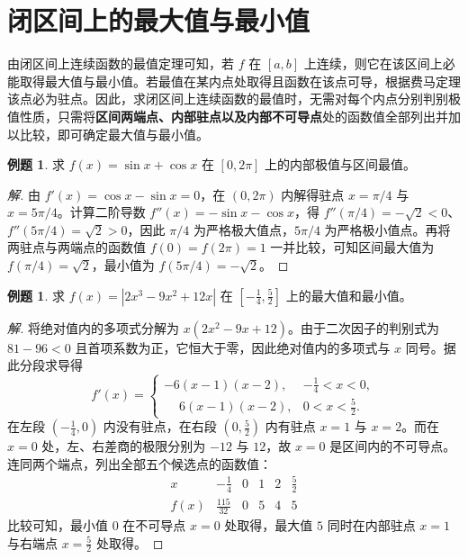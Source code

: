 \documentclass[UTF8,fontset=fandol,a4paper,12pt]{ctexart}
\theoremstyle{definition}
\newtheorem{example}[theorem]{例题}
\begin{document}
\section{闭区间上的最大值与最小值}
由闭区间上连续函数的最值定理可知，若 $f$ 在 $[a,b]$ 上连续，则它在该区间上必能取得最大值与最小值。若最值在某内点处取得且函数在该点可导，根据费马定理该点必为驻点。因此，求闭区间上连续函数的最值时，无需对每个内点分别判别极值性质，只需将\textbf{区间两端点、内部驻点以及内部不可导点}处的函数值全部列出并加以比较，即可确定最大值与最小值。

\begin{example}
求 $f(x)=\sin x+\cos x$ 在 $[0,2\pi]$ 上的内部极值与区间最值。
\end{example}

\begin{proof}[解]
由 $f'(x)=\cos x-\sin x=0$，在 $(0,2\pi)$ 内解得驻点 $x=\pi/4$ 与 $x=5\pi/4$。计算二阶导数 $f''(x)=-\sin x-\cos x$，得 $f''(\pi/4)=-\sqrt2<0$、$f''(5\pi/4)=\sqrt2>0$，因此 $\pi/4$ 为严格极大值点，$5\pi/4$ 为严格极小值点。再将两驻点与两端点的函数值 $f(0)=f(2\pi)=1$ 一并比较，可知区间最大值为 $f(\pi/4)=\sqrt2$，最小值为 $f(5\pi/4)=-\sqrt2$。
\end{proof}

\begin{example}
求 $f(x)=|2x^3-9x^2+12x|$ 在 $\left[-\frac14,\frac52\right]$ 上的最大值和最小值。
\end{example}

\begin{proof}[解]
将绝对值内的多项式分解为 $x(2x^2-9x+12)$。由于二次因子的判别式为 $81-96<0$ 且首项系数为正，它恒大于零，因此绝对值内的多项式与 $x$ 同号。据此分段求导得
\[
 f'(x)=
 \begin{cases}
 -6(x-1)(x-2), & -\frac14<x<0,\\
 \phantom{-}6(x-1)(x-2), & 0<x<\frac52.
 \end{cases}
\]
在左段 $\left(-\frac14,0\right)$ 内没有驻点，在右段 $\left(0,\frac52\right)$ 内有驻点 $x=1$ 与 $x=2$。而在 $x=0$ 处，左、右差商的极限分别为 $-12$ 与 $12$，故 $x=0$ 是区间内的不可导点。连同两个端点，列出全部五个候选点的函数值：
\[
 \begin{array}{c|ccccc}
 x & -\frac14 & 0 & 1 & 2 & \frac52 \\ \hline
 f(x) & \frac{115}{32} & 0 & 5 & 4 & 5
 \end{array}
\]
比较可知，最小值 $0$ 在不可导点 $x=0$ 处取得，最大值 $5$ 同时在内部驻点 $x=1$ 与右端点 $x=\frac52$ 处取得。
\end{proof}
\end{document}
